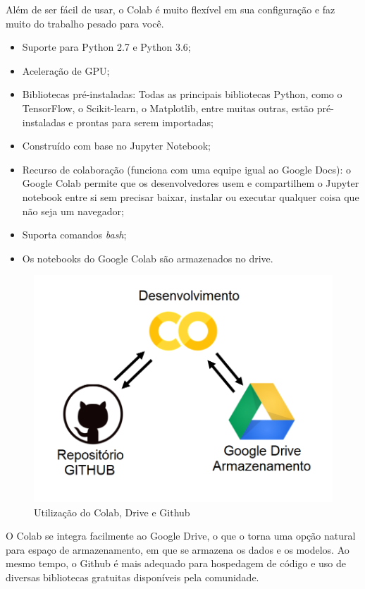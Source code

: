 Além de ser fácil de usar, o Colab é muito flexível em sua configuração e faz muito do trabalho pesado para você. \cite{colabdetail}

\begin{itemize}
    \item Suporte para Python 2.7 e Python 3.6;
    \item Aceleração de GPU;
    \item Bibliotecas pré-instaladas: Todas as principais bibliotecas Python, como o TensorFlow, o Scikit-learn, o Matplotlib, entre muitas outras, estão pré-instaladas e prontas para serem importadas;
    \item Construído com base no Jupyter Notebook;
    \item Recurso de colaboração (funciona com uma equipe igual ao Google Docs): o Google Colab permite que os desenvolvedores usem e compartilhem o Jupyter notebook entre si sem precisar baixar, instalar ou executar qualquer coisa que não seja um navegador;
    \item Suporta comandos \textit{bash};
    \item Os notebooks do Google Colab são armazenados no drive.
\end{itemize}

\begin{figure}[htbp]
		\centering
		\includegraphics[scale=0.4]{figuras/MachineLearning/colabGithub.png}
		\caption{Utilização do Colab, Drive e Github}
		\label{fig:colabGithub}
\end{figure}

O Colab se integra facilmente ao Google Drive, o que o torna uma opção natural para espaço de armazenamento, em que se armazena os dados e os modelos. Ao mesmo tempo, o Github é mais adequado para hospedagem de código e uso de diversas  bibliotecas gratuitas disponíveis pela comunidade. 

